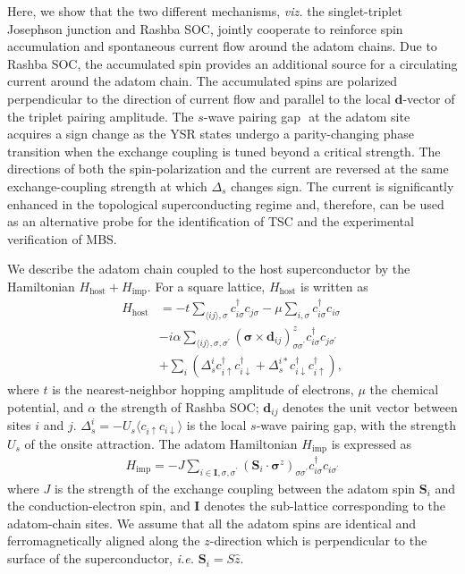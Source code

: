 \documentclass[aps,prl,reprint,nobibnotes]{revtex4-1}
\begin{document}
Here, we show that the two different mechanisms, \textit{viz.} the singlet-triplet Josephson junction and Rashba SOC, jointly cooperate to reinforce spin accumulation and spontaneous current flow around the adatom chains. Due to Rashba SOC, the accumulated spin provides an additional source for a circulating current around the adatom chain. The accumulated spins are polarized perpendicular to the direction of current flow and parallel to the local $\mathbf{d}$-vector of the triplet pairing amplitude. The $s$-wave pairing gap $ $ at the adatom site acquires a sign change as the YSR states undergo a parity-changing phase transition when the exchange coupling is tuned beyond a critical strength. The directions of both the spin-polarization and the current are reversed at the same exchange-coupling strength at which $\Delta_s$ changes sign. The current is significantly enhanced in the topological superconducting regime and, therefore, can be used as an alternative probe for the identification of TSC and the experimental verification of MBS.

We describe the adatom chain coupled to the host superconductor by the Hamiltonian $H_{\text{host}}+H_{\text{imp}}$. For a square lattice, $H_{\text{host}}$ is written as
\begin{align}
{H}_{\text{host}}&=-t \sum_{\langle ij \rangle,\sigma}c_{i \sigma}^{\dagger}c_{j\sigma}-\mu \sum_{i,\sigma}c_{i \sigma}^{\dagger}c_{i\sigma} \nonumber \\
& -i\alpha \sum_{\langle ij \rangle,\sigma, \sigma^{\prime}} (\boldsymbol{\sigma}\times \mathbf{d}_{ij})_{\sigma \sigma^{\prime}}^{z} c_{i\sigma}^{\dagger}c_{j\sigma^{\prime}} \nonumber \\
& +\sum_{i} (\Delta_{s}^{i} c_{i\uparrow}^{\dagger} c_{i\downarrow}^{\dagger}+\Delta_{s}^{i*} c_{i\downarrow}^{\dagger} c_{i\uparrow}^{\dagger}),
\label{H_host}
\end{align} 
where $t$ is the nearest-neighbor hopping amplitude of electrons, $\mu$ the chemical potential, and $\alpha$ the strength of Rashba SOC; $\mathbf{d}_{ij}$ denotes the unit vector between sites $i$ and $j$. $\Delta_s^{i}=-U_s \langle c_{i\uparrow} c_{i\downarrow} \rangle$ is the local $s$-wave pairing gap, with the strength $U_s$ of the onsite attraction. The adatom Hamiltonian $H_{\text{imp}}$ is expressed as
\begin{align}
H_{\text{imp}}=-J \sum_{i \in \mathbf{I}, \sigma, \sigma^{\prime}} (\mathbf{S}_i \cdot \boldsymbol{\sigma}^{z})_{\sigma \sigma^{\prime}} c_{i\sigma}^{\dagger}c_{i\sigma^{\prime}}
\label{H_imp}
\end{align} 
where $J$ is the strength of the exchange coupling between the adatom spin $\mathbf{S}_i$ and the conduction-electron spin, and $\mathbf{I}$ denotes the sub-lattice corresponding to the adatom-chain sites. We assume that all the adatom spins are identical and ferromagnetically aligned along the $z$-direction which is perpendicular to the surface of the superconductor, \textit{i.e.} $\mathbf{S}_i=S\hat{z}$. 
\end{document}
